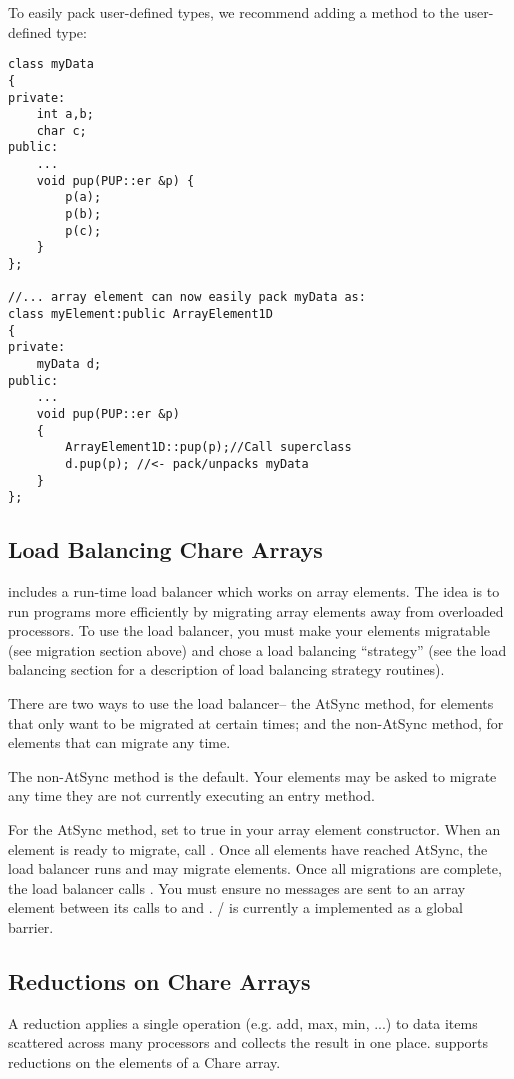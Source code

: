 To easily pack user-defined types, we recommend adding
a  method to the user-defined type:

\begin{verbatim}
class myData 
{
private:
    int a,b;
    char c;
public:
    ...
    void pup(PUP::er &p) {
        p(a);
        p(b);
        p(c);
    }
};

//... array element can now easily pack myData as:
class myElement:public ArrayElement1D 
{
private:
    myData d;
public:
    ...
    void pup(PUP::er &p)
    {
        ArrayElement1D::pup(p);//Call superclass
        d.pup(p); //<- pack/unpacks myData
    }
};
\end{verbatim}


\subsection{Load Balancing Chare Arrays}
\charmpp includes a run-time load balancer which works
on array elements.  The idea is to run programs more efficiently
by migrating array elements away from overloaded processors.
To use the load balancer, you must make your elements migratable
(see migration section above) and chose a load balancing 
``strategy'' (see the load balancing section for a description
of load balancing strategy routines).

There are two ways to use the load balancer-- the AtSync
method, for elements that only want to be migrated at certain
times; and the non-AtSync method, for elements that can migrate
any time.

The non-AtSync method is the default.  Your elements may be
asked to migrate any time they are not currently executing
an entry method.

For the AtSync method, set  to true in your 
array element constructor.  When an element is ready to migrate,
call .  Once all elements have reached AtSync, 
the load balancer runs and may migrate elements.  Once
all migrations are complete, the load balancer calls 
.  You must ensure no messages are
sent to an array element between its calls to  and
. / is currently
a implemented as a global barrier.



\subsection{Reductions on Chare Arrays}
A reduction applies a single operation (e.g. add,
max, min, ...) to data items scattered across many processors and
collects the result in one place.  \charmpp supports reductions on the
elements of a Chare array.

